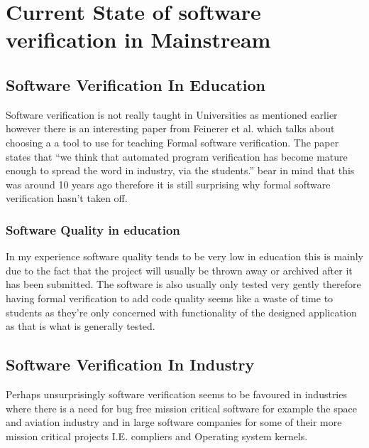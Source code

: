 \documentclass[a4paper,12pt]{scrartcl}
\begin{document}
	\section{Current State of software verification in Mainstream}
	{
		\subsection{Software Verification In Education}
		{
			Software verification is not really taught in Universities as mentioned earlier however there is an interesting paper from Feinerer et al. \cite{Feinerer2008} which talks about choosing a a tool to use for teaching Formal software verification. The paper states that \enquote{we think that automated program verification has become mature enough to spread the word in industry, via the students.}\cite{Feinerer2008} bear in mind that this was around 10 years ago therefore it is still surprising why formal software verification hasn't taken off.
			\subsubsection{Software Quality in education}
			{
				In my experience software quality tends to be very low in education this is mainly due to the fact that the project will usually be thrown away or archived after it has been submitted. The software is also usually only tested very gently therefore having formal verification to add code quality seems like a waste of time to students as they're only concerned with functionality of the designed application as that is what is generally tested.
			}
		}
		\subsection{Software Verification In Industry}
		{
			Perhaps unsurprisingly software verification seems to be favoured in industries where there is a need for bug free mission critical software for example the space and aviation industry\cite{Feldt2010, Nelson2003} and in large software companies for some of their more mission critical projects\cite{Hunt2005} I.E. compliers and Operating system kernels. 
		}
	}
\end{document}
